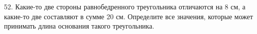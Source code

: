 52. Какие-то две стороны равнобедренного треугольника отличаются на 8 см, а какие-то две составляют в сумме 20 см. Определите все значения, которые может принимать длина основания такого треугольника.\\
